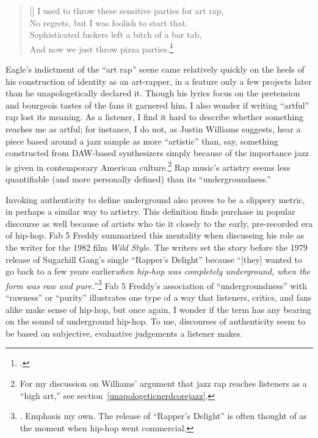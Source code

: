 \settowidth{\versewidth}{I used to throw these sensitive parties for art rap,}
    \begin{verse}[\versewidth]
        I used to throw these sensitive parties for art rap, \\
        No regrets, but I was foolish to start that. \\
        Sophisticated fuckers left a bitch of a bar tab, \\
        And now we just throw pizza parties.\footnote{
        \cite{milo2013}.}
    \end{verse}
Eagle's indictment of the ``art rap'' scene came relatively quickly on the heels of his construction of
identity as an art-rapper, in a feature only a few projects later than he unapologetically declared
it. Though his lyrics focus on the pretension and bourgeois tastes of the fans it garnered him, I also 
wonder if writing ``artful'' rap lost its meaning. As a listener, I find it hard to describe whether
something reaches me as artful; for instance, I do not, as Justin Williams suggests, hear a piece based 
around a jazz sample as more ``artistic'' than, say, something constructed from DAW-based synthesizers 
simply because of the importance jazz is given in contemporary American culture.\footnote{
    For my discussion on Williams' argument that jazz rap reaches listeners as a ``high art,'' see
    section~\ref{unapologeticnerdcorejazz}.} 
Rap music's artistry seems less quantifiable (and more personally defined) than its ``undergroundness.''

Invoking authenticity to define underground also proves to be a slippery metric, in perhaps a similar way
to artistry. This definition finds purchase in popular discourse as well because of artists who tie it
closely to the early, pre-recorded era of hip-hop. Fab 5 Freddy summarized this mentality when discussing 
his role as the writer for the 1982 film \textit{Wild Style}. The writers set the story before the 1979
release of Sugarhill Gang's single ``Rapper's Delight'' because ``[they] wanted to go back to a few years 
earlier\textellipsis \emph{when hip-hop was completely underground, when the form was raw and pure.}''\footnote{
    \autocite[23]{justinawilliamsRhyminStealinMusical2013}. Emphasis my own. The release
    of ``Rapper's Delight'' is often thought of as the moment when hip-hop went commercial.}
Fab 5 Freddy's association of ``undergroundness'' with ``rawness'' or ``purity'' illustrates one type
of a way that listeners, critics, and fans alike make sense of hip-hop, but once again, I wonder if the
term has any bearing on the sound of underground hip-hop. To me, discourses of authenticity seem to be
based on subjective, evaluative judgements a listener makes.

